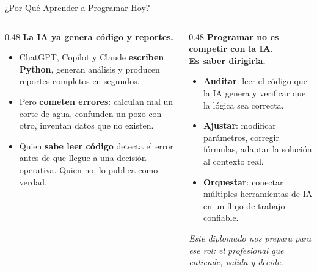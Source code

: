 \documentclass[aspectratio=169, 11pt]{beamer}
\begin{document}
\begin{frame}{¿Por Qué Aprender a Programar Hoy?}
  \vspace{-4pt}
  {\footnotesize
  \begin{columns}[T]
    \begin{column}{0.48\textwidth}
      {\small\color{arcaDark}\bfseries La IA ya genera código y reportes.}

      \vspace{6pt}
      \begin{itemize}\setlength{\itemsep}{6pt}
        \item[{\color{arcaRed}\scriptsize\faRobot}]
          ChatGPT, Copilot y Claude \textbf{escriben Python}, generan análisis
          y producen reportes completos en segundos.

        \item[{\color{arcaRed}\scriptsize\faExclamationTriangle}]
          Pero \textbf{cometen errores}: calculan mal un corte de agua,
          confunden un pozo con otro, inventan datos que no existen.

        \item[{\color{arcaRed}\scriptsize\faUserShield}]
          Quien \textbf{sabe leer código} detecta el error antes de
          que llegue a una decisión operativa.
          Quien no, lo publica como verdad.
      \end{itemize}
    \end{column}

    \begin{column}{0.48\textwidth}
      {\small\color{arcaDark}\bfseries Programar no es competir con la IA.\\
      Es saber dirigirla.}

      \vspace{6pt}
      \begin{itemize}\setlength{\itemsep}{6pt}
        \item[{\color{arcaRed}\scriptsize\faSearch}]
          \textbf{Auditar}: leer el código que la IA genera y
          verificar que la lógica sea correcta.

        \item[{\color{arcaRed}\scriptsize\faSlidersH}]
          \textbf{Ajustar}: modificar parámetros, corregir fórmulas,
          adaptar la solución al contexto real.

        \item[{\color{arcaRed}\scriptsize\faProjectDiagram}]
          \textbf{Orquestar}: conectar múltiples herramientas
          de IA en un flujo de trabajo confiable.
      \end{itemize}

      \vspace{6pt}
      {\scriptsize\color{textMuted}\itshape
        Este diplomado nos prepara para ese rol:
        el profesional que entiende, valida y decide.}
    \end{column}
  \end{columns}
  }
\end{frame}
\end{document}
